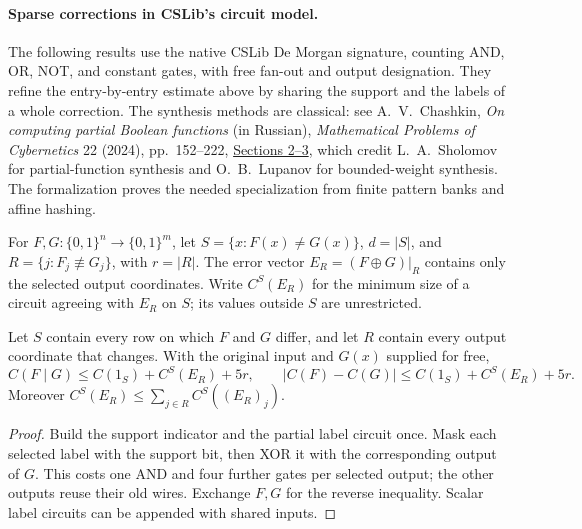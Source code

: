 \paragraph{Sparse corrections in CSLib's circuit model.}
The following results use the native CSLib De Morgan signature, counting
AND, OR, NOT, and constant gates, with free fan-out and output designation.
They refine the entry-by-entry estimate above by sharing the support and
the labels of a whole correction. The synthesis methods are classical:
see A.~V.~Chashkin, \emph{On computing partial Boolean functions} (in Russian),
\emph{Mathematical Problems of Cybernetics} 22 (2024), pp.~152--222,
\href{https://doi.org/10.20948/mvk-2024-152}{Sections 2--3}, which credit
L.~A.~Sholomov for partial-function synthesis and O.~B.~Lupanov for
bounded-weight synthesis. The formalization proves the needed specialization
from finite pattern banks and affine hashing.

\begin{definition}
  \label{def:lowerbounds-correction}
  \leanok
  For $F,G:\{0,1\}^n\to\{0,1\}^m$, let
  $S=\{x:F(x)\ne G(x)\}$, $d=|S|$, and
  $R=\{j:F_j\not\equiv G_j\}$, with $r=|R|$.
  The error vector $E_R=(F\oplus G)|_R$ contains only the selected output
  coordinates. Write $C^S(E_R)$ for the minimum size of a circuit agreeing
  with $E_R$ on $S$; its values outside $S$ are unrestricted.
\end{definition}

\begin{theorem}
  \label{thm:lowerbounds-relative-correction}
  \leanok
  Let $S$ contain every row on which $F$ and $G$ differ, and let $R$ contain
  every output coordinate that changes. With the original input and $G(x)$
  supplied for free,
  \[
    C(F\mid G)\le C(1_S)+C^S(E_R)+5r,
    \qquad
    |C(F)-C(G)|\le C(1_S)+C^S(E_R)+5r.
  \]
  Moreover $C^S(E_R)\le\sum_{j\in R}C^S((E_R)_j)$.
\end{theorem}
\begin{proof}
  \leanok
  Build the support indicator and the partial label circuit once. Mask each
  selected label with the support bit, then XOR it with the corresponding
  output of $G$. This costs one AND and four further gates per selected
  output; the other outputs reuse their old wires. Exchange $F,G$ for the
  reverse inequality. Scalar label circuits can be appended with shared
  inputs.
\end{proof}

